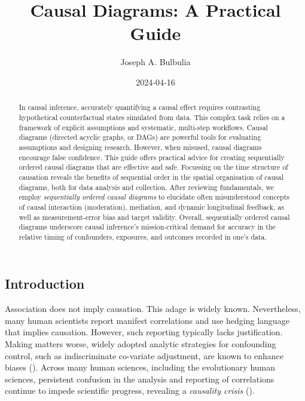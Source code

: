 \documentclass[
  singlecolumn]{article}
\title{Causal Diagrams: A Practical Guide}
\author{Joseph A. Bulbulia}
\date{2024-04-16}
\begin{document}
\maketitle
\begin{abstract}
In causal inference, accurately quantifying a causal effect requires
contrasting hypothetical counterfactual states simulated from data. This
complex task relies on a framework of explicit assumptions and
systematic, multi-step workflows. Causal diagrams (directed acyclic
graphs, or DAGs) are powerful tools for evaluating assumptions and
designing research. However, when misused, causal diagrams encourage
false confidence. This guide offers practical advice for creating
sequentially ordered causal diagrams that are effective and safe.
Focussing on the time structure of causation reveals the benefits of
sequential order in the spatial organisation of causal diagrams, both
for data analysis and collection. After reviewing fundamentals, we
employ \emph{sequentially ordered causal diagrams} to elucidate often
misunderstood concepts of causal interaction (moderation), mediation,
and dynamic longitudinal feedback, as well as measurement-error bias and
target validity. Overall, sequentially ordered causal diagrams
underscore causal inference's mission-critical demand for accuracy in
the relative timing of confounders, exposures, and outcomes recorded in
one's data.
\end{abstract}

\subsection{Introduction}\label{introduction}

Association does not imply causation. This adage is widely known.
Nevertheless, many human scientists report manifest correlations and use
hedging language that implies causation. However, such reporting
typically lacks justification. Making matters worse, widely adopted
analytic strategies for confounding control, such as indiscriminate
co-variate adjustment, are known to enhance biases
(). Across many human
sciences, including the evolutionary human sciences, persistent
confusion in the analysis and reporting of correlations continue to
impede scientific progress, revealing a \emph{causality crisis}
().
\end{document}
